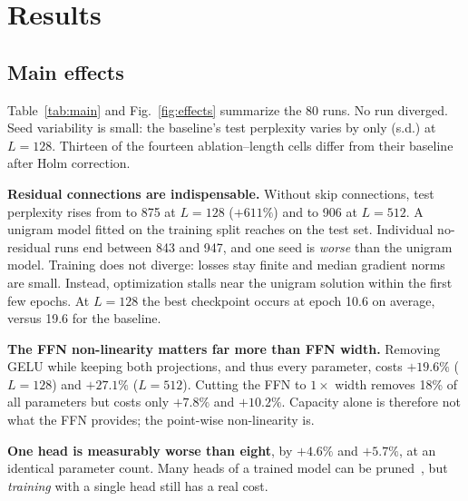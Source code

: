 \documentclass[conference]{IEEEtran}
\begin{document}
\section{Results}

\begin{table}[t]
\centering
\caption{Test perplexity (mean $\pm$ s.d.\ over \NSeeds{} seeds) of the best-validation checkpoint,
and its change relative to the baseline at the same context length $L$. $p_\mathrm{Holm}$: Welch
$t$-test on per-token test loss, Holm-corrected over all 14 comparisons. Parameter counts are for
$L{=}128$; learned position tables add 98k parameters at $L{=}512$. Absolute perplexities are
comparable within a column, but not across $L$ (Section~\ref{sec:budget}).}
\label{tab:main}

\end{table}

\subsection{Main effects}
Table~\ref{tab:main} and Fig.~\ref{fig:effects} summarize the 80 runs. No run diverged. Seed
variability is small: the baseline's test perplexity varies by only \BaselineSDShort{} (s.d.)
at $L{=}128$. Thirteen of the fourteen ablation--length cells differ from their baseline after
Holm correction.

\textbf{Residual connections are indispensable.} Without skip connections, test perplexity rises
from \BaselinePPLShort{} to 875 at $L{=}128$ ($+611\%$) and to 906 at $L{=}512$. A unigram model
fitted on the training split reaches \UnigramTestPPL{} on the test set. Individual no-residual runs
end between 843 and 947, and one seed is \emph{worse} than the unigram model. Training does not
diverge: losses stay finite and median gradient norms are small. Instead, optimization stalls near
the unigram solution within the first few epochs. At $L{=}128$ the best checkpoint occurs at epoch 10.6 on average,
versus 19.6 for the baseline.

\textbf{The FFN non-linearity matters far more than FFN width.} Removing GELU while keeping both
projections, and thus every parameter, costs $+19.6\%$ ($L{=}128$) and $+27.1\%$ ($L{=}512$).
Cutting the FFN to $1\times$ width removes 18\% of all parameters but costs only $+7.8\%$ and
$+10.2\%$. Capacity alone is therefore not what the FFN provides; the point-wise non-linearity is.

\textbf{One head is measurably worse than eight}, by $+4.6\%$ and $+5.7\%$, at an identical
parameter count. Many heads of a trained model can be pruned~\cite{michel2019sixteen,voita2019analyzing},
but \emph{training} with a single head still has a real cost.
\end{document}

